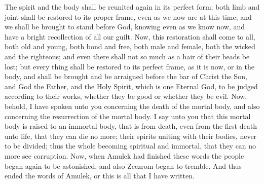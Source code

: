 The spirit and the body shall be reunited again in its perfect form; both limb and joint shall be restored to its proper frame, even as we now are at this time; and we shall be brought to stand before God, knowing even as we know now, and have a bright recollection of all our guilt.
\bverse \iffalse Now, this restoration shall come to all, both old and young, both bond and free, both male and female, both the wicked and the righteous; and even there shall not so much as a hair of their heads be lost; but every thing shall be restored to its perfect frame, as it is now, or in the body, and shall be brought and be arraigned before the bar of Christ the Son, and God the Father, and the Holy Spirit, which is one Eternal God, to be judged according to their works, whether they be good or whether they be evil. \fi
Now, this restoration shall come to all, both old and young, both bond and free, both male and female, both the wicked and the righteous; and even there shall not so much as a hair of their heads be lost; but every thing shall be restored to its perfect frame, as it is now, or in the body, and shall be brought and be arraigned before the bar of Christ the Son, and God the Father, and the Holy Spirit, which is one Eternal God, to be judged according to their works, whether they be good or whether they be evil.
\bverse \iffalse Now, behold, I have spoken unto you concerning the death of the mortal body, and also concerning the resurrection of the mortal body. I say unto you that this mortal body is raised to an immortal body, that is from death, even from the first death unto life, that they can die no more; their spirits uniting with their bodies, never to be divided; thus the whole becoming spiritual and immortal, that they can no more see corruption. \fi
Now, behold, I have spoken unto you concerning the death of the mortal body, and also concerning the resurrection of the mortal body. I say unto you that this mortal body is raised to an immortal body, that is from death, even from the first death unto life, that they can die no more; their spirits uniting with their bodies, never to be divided; thus the whole becoming spiritual and immortal, that they can no more see corruption.
\bverse \iffalse Now, when Amulek had finished these words the people began again to be astonished, and also Zeezrom began to tremble. And thus ended the words of Amulek, or this is all that I have written. \fi
Now, when Amulek had finished these words the people began again to be astonished, and also Zeezrom began to tremble. And thus ended the words of Amulek, or this is all that I have written.
